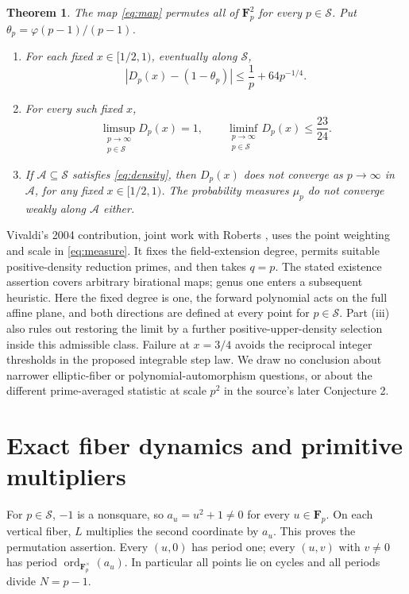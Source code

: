 \documentclass[11pt]{article}
\newtheorem{theorem}{Theorem}
\theoremstyle{remark}
\newcommand{\Fp}{\mathbf F_p}
\newcommand{\ord}{\operatorname{ord}}
\begin{document}
\begin{theorem}\label{thm:main}
The map \eqref{eq:map} permutes all of $\Fp^2$ for every $p\in\mathcal S$.
Put $\theta_p=\varphi(p-1)/(p-1)$.
\par
\begin{enumerate}
\item For each fixed $x\in[1/2,1)$, eventually along $\mathcal S$,
\begin{equation}\label{eq:error}
 \left|D_p(x)-(1-\theta_p)\right|
       \le \frac1p+64p^{-1/4}.
\end{equation}
\item For every such fixed $x$,
\begin{equation}\label{eq:gap}
 \limsup_{\substack{p\to\infty\\p\in\mathcal S}}D_p(x)=1,
 \qquad
 \liminf_{\substack{p\to\infty\\p\in\mathcal S}}D_p(x)\le\frac{23}{24}.
\end{equation}
\item If $\mathcal A\subseteq\mathcal S$ satisfies \eqref{eq:density},
then $D_p(x)$ does not converge as $p\to\infty$ in $\mathcal A$, for any
fixed $x\in[1/2,1)$. The probability measures $\mu_p$ do not converge
weakly along $\mathcal A$ either.
\end{enumerate}
\end{theorem}

Vivaldi's 2004 contribution, joint work with Roberts
\cite[pp.2944--2945, Conjecture 1]{V}, uses the point weighting and scale
in \eqref{eq:measure}. It fixes the field-extension degree, permits
suitable positive-density reduction primes, and then takes $q=p$.
The stated existence assertion covers arbitrary birational maps;
genus one enters a subsequent heuristic. Here the fixed degree is one,
the forward polynomial acts on the full affine plane, and both directions
are defined at every point for $p\in\mathcal S$. Part (iii) also rules
out restoring the limit by a further positive-upper-density selection
inside this admissible class. Failure at $x=3/4$ avoids the reciprocal
integer thresholds in the proposed integrable step law. We draw no
conclusion about narrower elliptic-fiber or polynomial-automorphism
questions, or about the different prime-averaged statistic at scale $p^2$
in the source's later Conjecture 2.

\section{Exact fiber dynamics and primitive multipliers}
For $p\in\mathcal S$, $-1$ is a nonsquare, so $a_u=u^2+1\ne0$ for
every $u\in\Fp$. On each vertical fiber, $L$ multiplies the second
coordinate by $a_u$. This proves the permutation assertion. Every
$(u,0)$ has period one; every $(u,v)$ with $v\ne0$ has period
$\ord_{\Fp^\times}(a_u)$. In particular all points lie on cycles and all
periods divide $N=p-1$.
\end{document}
